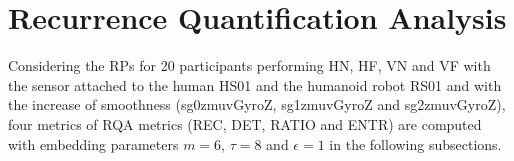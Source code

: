 \section{Recurrence Quantification Analysis}

Considering the RPs for 20 participants performing HN, HF, VN and VF
with the sensor attached to the human HS01 and the humanoid robot RS01 
and with the increase of smoothness 
(sg0zmuvGyroZ, sg1zmuvGyroZ and sg2zmuvGyroZ), 
four metrics of RQA metrics (REC, DET, RATIO and ENTR) 
are computed with embedding parameters $m=6$, $\tau=8$ and $\epsilon=1$
in the following subsections.




